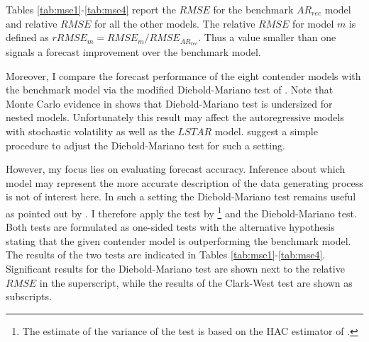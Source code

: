 \documentclass[12pt,letterpaper,fleqn]{article}           %
\begin{document}
Tables \ref{tab:mse1}-\ref{tab:mse4} report the $RMSE$ for the benchmark $AR_{rec}$ model and relative $RMSE$ for all the other models. The relative $RMSE$ for model $m$ is defined as $rRMSE_m = RMSE_m / RMSE_{AR_{rec}}$. Thus a value smaller than one signals a forecast improvement over the benchmark model.

Moreover, I compare the forecast performance of the eight contender models with the benchmark model via the modified Diebold-Mariano test of \textcite{harvey97}. Note that Monte Carlo evidence in \textcite{clark01} shows that Diebold-Mariano test is undersized for nested models. Unfortunately this result may affect the autoregressive models with stochastic volatility as well as the $LSTAR$ model. \textcite{clark07} suggest a simple procedure to adjust the Diebold-Mariano test for such a setting.

However, my focus lies on evaluating forecast accuracy. Inference about which model may represent the more accurate description of the data generating process is not of interest here. In such a setting the Diebold-Mariano test remains useful as pointed out by \textcite{diebold15}. I therefore apply the test by \textcite{clark07}\footnote{The estimate of the variance of the test is based on the HAC estimator of \textcite{newey94}.} and the Diebold-Mariano test. Both tests are formulated as one-sided tests with the alternative hypothesis stating that the given contender model is outperforming the benchmark model. The results of the two tests are indicated in Tables \ref{tab:mse1}-\ref{tab:mse4}. Significant results for the Diebold-Mariano test are shown next to the relative $RMSE$ in the superscript, while the results of the Clark-West test are shown as subscripts.
\end{document}
